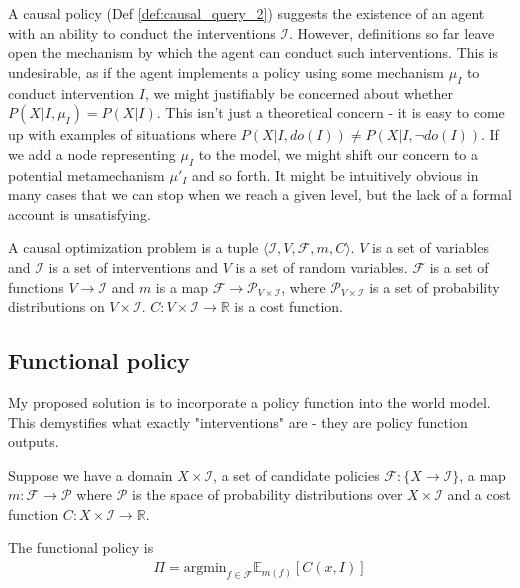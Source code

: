 A causal policy (Def \ref{def:causal_query_2}) suggests the existence of an agent with an ability to conduct the interventions $\mathcal{I}$. However, definitions so far leave open the mechanism by which the agent can conduct such interventions. This is undesirable, as if the agent implements a policy using some mechanism $\mu_I$ to conduct intervention $I$, we might justifiably be concerned about whether $P(X|I,\mu_I)=P(X|I)$. This isn't just a theoretical concern - it is easy to come up with examples of situations where $P(X|I,do(I))\neq P(X|I,\neg do(I))$. If we add a node representing $\mu_I$ to the model, we might shift our concern to a potential metamechanism $\mu'_I$ and so forth. It might be intuitively obvious in many cases that we can stop when we reach a given level, but the lack of a formal account is unsatisfying.

\begin{definition}\label{def:copt_prob}
A causal optimization problem is a tuple $\langle \mathcal{I}, V, \mathcal{F}, m, C\rangle$. $V$ is a set of variables and $\mathcal{I}$ is a set of interventions and $V$ is a set of random variables. $\mathcal{F}$ is a set of functions $V\to \mathcal{I}$ and $m$ is a map $\mathcal{F}\to \mathcal{P}_{V\times \mathcal{I}}$, where $\mathcal{P}_{V\times \mathcal{I}}$ is a set of probability distributions on $V\times \mathcal{I}$. $C:V\times \mathcal{I} \to \mathbb{R}$ is a cost function.
\end{definition}

\subsection{Functional policy}

My proposed solution is to incorporate a policy function into the world model. This demystifies what exactly "interventions" are - they are policy function outputs.

\begin{definition}\label{def:fp_cpq}
Suppose we have a domain $X\times\mathcal{I}$, a set of candidate policies $\mathcal{F}:\{X\to \mathcal{I}\}$, a map $m:\mathcal{F}\to \mathcal{P}$ where $\mathcal{P}$ is the space of probability distributions over $X\times\mathcal{I}$ and a cost function $C:X\times\mathcal{I}\to \mathbb{R}$.

The functional policy is
\begin{align}
    \Pi=\mathrm{argmin}_{f\in\mathcal{F}}\mathbb{E}_{m(f)}[C(x,I)]    \label{eq:func_cp}
\end{align}
\end{definition}

